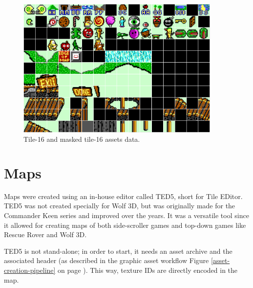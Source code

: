 \documentclass[book.tex]{subfiles}
\begin{document}
\begin{figure}[H] 
  \centering 
  \includegraphics[width=0.9\textwidth, frame]{screenshots_300dpi/tile16M_assets.png}
  \caption{Tile-16 and masked tile-16 assets data.}
  \label{fig:tile16_assets}
\end{figure} 



\section{Maps}
Maps were created using an in-house editor called TED5, short for Tile EDitor. TED5 was not created specially for Wolf 3D, but was originally made for the Commander Keen series and improved over the years. It was a versatile tool since it allowed for creating maps of both side-scroller games and top-down games like Rescue Rover and Wolf 3D.\\
\par
 TED5 is not stand-alone; in order to start, it needs an asset archive and the  associated header (as described in the graphic asset workflow Figure \ref{asset-creation-pipeline} on page \pageref{asset-creation-pipeline}). This way, texture IDs are directly encoded in the map.\\

 
 \par
 \\
 \par
{}\\
 


 \\
\par
\vspace{20pt}
\par
\end{document}
